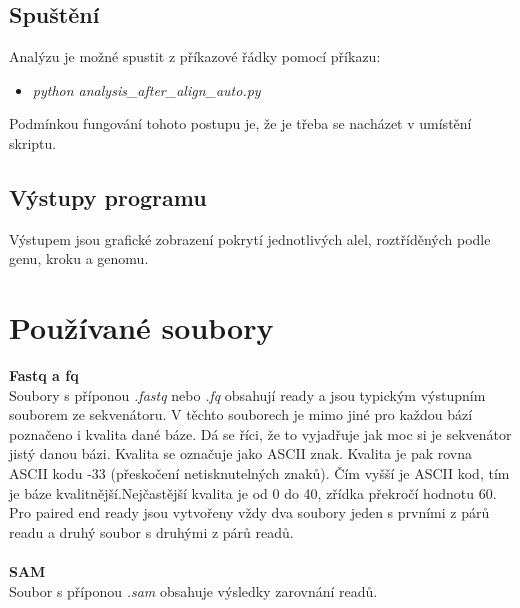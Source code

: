 \documentclass[czech,DP]{thesiskiv}
\numberwithin{equation}{section}
\begin{document}
\subsection{Spuštění}
Analýzu je možné spustit z příkazové řádky pomocí příkazu:
\begin{itemize}
 \item \colorbox{gray!15}{\textit{python analysis\_after\_align\_auto.py}}
\end{itemize}
\noindent
Podmínkou fungování tohoto postupu je, že je třeba se nacházet v umístění skriptu. 

\subsection{Výstupy programu}
Výstupem jsou grafické zobrazení pokrytí jednotlivých alel, roztříděných podle genu, kroku a genomu.





\section{Používané soubory}

\textbf{Fastq a fq}
\\
\noindent
Soubory s příponou \textit{.fastq} nebo \textit{.fq} obsahují ready a jsou typickým výstupním souborem ze sekvenátoru. V těchto souborech je mimo jiné pro každou bází poznačeno i kvalita dané báze. Dá se říci, že to vyjadřuje jak moc si je sekvenátor jistý danou bázi. Kvalita se označuje jako ASCII znak. Kvalita je pak rovna ASCII kodu -33 (přeskočení netisknutelných znaků). Čím vyšší je ASCII kod, tím je báze kvalitnější.Nejčastější kvalita je od 0 do 40, zřídka překročí hodnotu 60. Pro paired end ready jsou vytvořeny vždy dva soubory jeden s prvními z párů readu a druhý soubor s druhými z párů readů. 
\\
\\
\textbf{SAM}	   
\\
\noindent 
Soubor s příponou \textit{.sam} obsahuje výsledky zarovnání readů.
\end{document}
